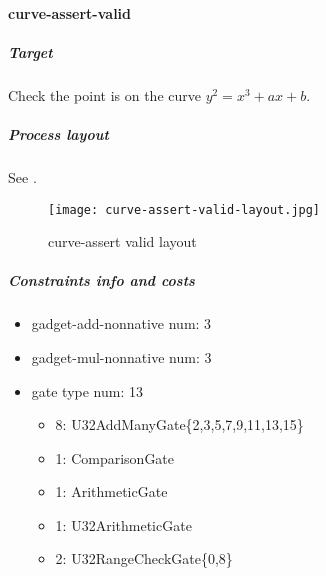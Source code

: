 \paragraph{curve-assert-valid}

\subparagraph{Target}
Check the point is on the curve $y^2 = x^3 + ax + b$.

\subparagraph{Process layout}
See .
\begin{figure}[!ht]
    \centering
    \texttt{[image: curve-assert-valid-layout.jpg]}
    \caption{curve-assert valid layout}
    \label{fig:curve-assert-valid-layout}
\end{figure}

\subparagraph{Constraints info and costs}
\begin{itemize}
    \item gadget-add-nonnative num: 3
    \item gadget-mul-nonnative num: 3
    \item gate type num: 13
        \begin{itemize}
            \item 8: U32AddManyGate\{2,3,5,7,9,11,13,15\}
            \item 1: ComparisonGate
            \item 1: ArithmeticGate
            \item 1: U32ArithmeticGate
            \item 2: U32RangeCheckGate\{0,8\}
        \end{itemize}
\end{itemize}
